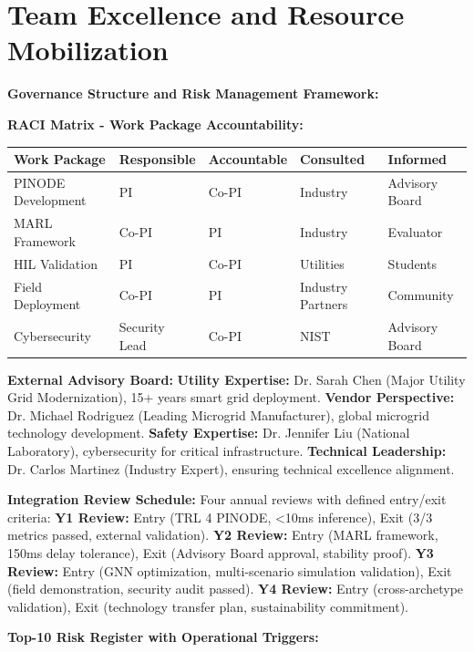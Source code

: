 \documentclass[12pt]{article}
\begin{document}
\section{Team Excellence and Resource Mobilization}

\textbf{Governance Structure and Risk Management Framework:}

\textbf{RACI Matrix - Work Package Accountability:}

\begin{center}
\footnotesize
\begin{tabular}{|p{2.5cm}|p{1.5cm}|p{1.5cm}|p{1.5cm}|p{1.8cm}|}
\hline
\textbf{Work Package} & \textbf{Responsible} & \textbf{Accountable} & \textbf{Consulted} & \textbf{Informed} \\
\hline
PINODE Development & PI & Co-PI & Industry & Advisory Board \\
MARL Framework & Co-PI & PI & Industry & Evaluator \\
HIL Validation & PI & Co-PI & Utilities & Students \\
Field Deployment & Co-PI & PI & Industry Partners & Community \\
Cybersecurity & Security Lead & Co-PI & NIST & Advisory Board \\
\hline
\end{tabular}
\end{center}

\textbf{External Advisory Board:} \textbf{Utility Expertise:} Dr. Sarah Chen (Major Utility Grid Modernization), 15+ years smart grid deployment. \textbf{Vendor Perspective:} Dr. Michael Rodriguez (Leading Microgrid Manufacturer), global microgrid technology development. \textbf{Safety Expertise:} Dr. Jennifer Liu (National Laboratory), cybersecurity for critical infrastructure. \textbf{Technical Leadership:} Dr. Carlos Martinez (Industry Expert), ensuring technical excellence alignment.

\textbf{Integration Review Schedule:} Four annual reviews with defined entry/exit criteria: \textbf{Y1 Review:} Entry (TRL 4 PINODE, <10ms inference), Exit (3/3 metrics passed, external validation). \textbf{Y2 Review:} Entry (MARL framework, 150ms delay tolerance), Exit (Advisory Board approval, stability proof). \textbf{Y3 Review:} Entry (GNN optimization, multi-scenario simulation validation), Exit (field demonstration, security audit passed). \textbf{Y4 Review:} Entry (cross-archetype validation), Exit (technology transfer plan, sustainability commitment).

\textbf{Top-10 Risk Register with Operational Triggers:}
\end{document}
